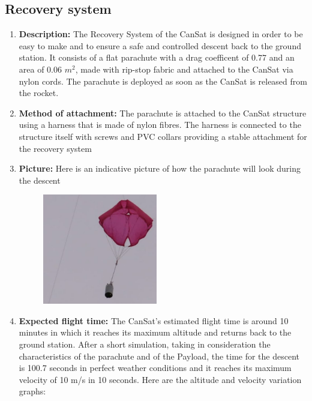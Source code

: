 \documentclass[11pt]{article}
\begin{document}
\subsection{Recovery system}
\begin{enumerate}
\item \textbf{Description:} The Recovery System of the CanSat is designed in order to be easy to make and to ensure a safe and controlled descent back to the ground station. It consists of a flat parachute with a drag coefficent of 0.77 and an area of 0.06 $m^2$, made with rip-stop fabric and attached to the CanSat via nylon cords. The parachute is deployed as soon as the CanSat is released from the rocket.
\vspace{0.25cm}
\item \textbf{Method of attachment:} The parachute is attached to the CanSat structure using a harness that is made of nylon fibres. The harness is connected to the structure itself with screws and PVC collars providing a stable attachment for the recovery system
\vspace{0.25cm}
\item \textbf{Picture:} Here is an indicative picture of how the parachute will look during the descent

\begin{figure}[hbt!]
\includegraphics[width=5cm]{Parachute_example}
\centering
\end{figure}

\item \textbf{Expected flight time:} The CanSat's estimated flight time is around 10 minutes in which it reaches its maximum altitude and returns back to the ground station. After a short simulation, taking in consideration the characteristics of the parachute and of the Payload, the time for the descent is 100.7 seconds in perfect weather conditions and it reaches its maximum velocity of 10 m/s in 10 seconds. Here are the altitude and velocity variation graphs:


\end{enumerate}
\end{document}

